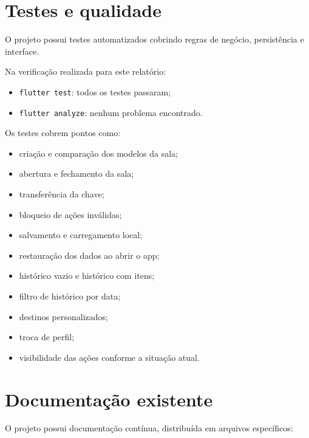 \documentclass[12pt,a4paper]{article}
\begin{document}
\section{Testes e qualidade}

O projeto possui testes automatizados cobrindo regras de negócio, persistência e interface.

Na verificação realizada para este relatório:

\begin{itemize}
    \item \texttt{flutter test}: todos os testes passaram;
    \item \texttt{flutter analyze}: nenhum problema encontrado.
\end{itemize}

Os testes cobrem pontos como:

\begin{itemize}
    \item criação e comparação dos modelos da sala;
    \item abertura e fechamento da sala;
    \item transferência da chave;
    \item bloqueio de ações inválidas;
    \item salvamento e carregamento local;
    \item restauração dos dados ao abrir o app;
    \item histórico vazio e histórico com itens;
    \item filtro de histórico por data;
    \item destinos personalizados;
    \item troca de perfil;
    \item visibilidade das ações conforme a situação atual.
\end{itemize}

\section{Documentação existente}

O projeto possui documentação contínua, distribuída em arquivos específicos:
\end{document}
